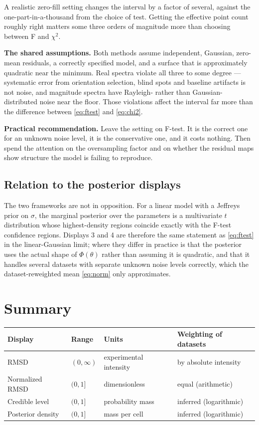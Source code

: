 \documentclass[11pt,a4paper]{article}
\begin{document}
A realistic zero-fill setting changes the interval by a factor of several,
against the one-part-in-a-thousand from the choice of test. Getting the
effective point count roughly right matters some three orders of magnitude
more than choosing between F and $\chi^2$.

\textbf{The shared assumptions.} Both methods assume independent, Gaussian,
zero-mean residuals, a correctly specified model, and a surface that is
approximately quadratic near the minimum. Real spectra violate all three to
some degree --- systematic error from orientation selection, blind spots and
baseline artifacts is not noise, and magnitude spectra have Rayleigh- rather
than Gaussian-distributed noise near the floor. Those violations affect the
interval far more than the difference between \eqref{eq:ftest} and
\eqref{eq:chi2}.

\textbf{Practical recommendation.} Leave the setting on F-test. It is the
correct one for an unknown noise level, it is the conservative one, and it
costs nothing. Then spend the attention on the oversampling factor and on
whether the residual maps show structure the model is failing to reproduce.

\subsection{Relation to the posterior displays}

The two frameworks are not in opposition. For a linear model with a
Jeffreys prior on $\sigma$, the marginal posterior over the parameters is a
multivariate $t$ distribution whose highest-density regions coincide exactly
with the F-test confidence regions. Displays 3 and 4 are therefore the same
statement as \eqref{eq:ftest} in the linear-Gaussian limit; where they
differ in practice is that the posterior uses the actual shape of
$\Phi(\theta)$ rather than assuming it is quadratic, and that it handles
several datasets with separate unknown noise levels correctly, which the
dataset-reweighted mean \eqref{eq:norm} only approximates.

\section{Summary}

\begin{center}
\begin{tabular}{llll}
\hline
Display & Range & Units & Weighting of datasets \\
\hline
RMSD                & $(0,\infty)$ & experimental intensity & by absolute intensity \\
Normalized RMSD     & $(0,1]$      & dimensionless          & equal (arithmetic) \\
Credible level      & $(0,1]$      & probability mass       & inferred (logarithmic) \\
Posterior density   & $(0,1]$      & mass per cell          & inferred (logarithmic) \\
\hline
\end{tabular}
\end{center}
\end{document}
